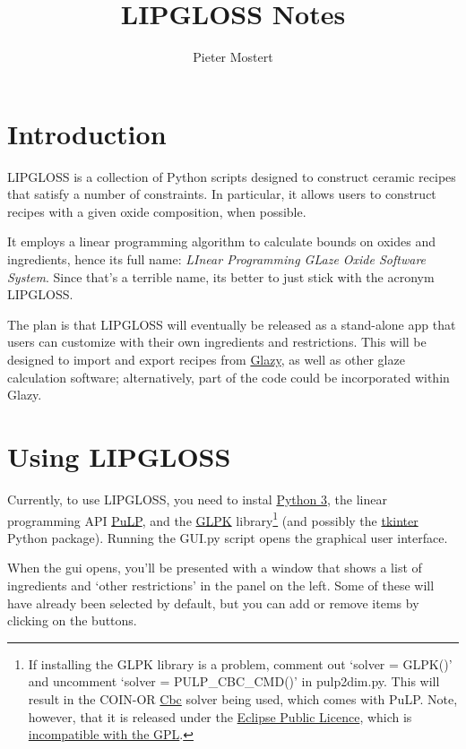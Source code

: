 \documentclass[a4paper,10pt]{article}
\title{LIPGLOSS Notes}
\author{Pieter Mostert}%
\def\'{\textquotesingle}
\begin{document}
\maketitle
\def\thefootnote{\fnsymbol{footnote}}\setcounter{footnote}{1}
\section{Introduction}
LIPGLOSS is a collection of Python scripts designed to construct ceramic recipes that satisfy a number of constraints. In particular, it allows users to construct recipes with a given oxide composition, when possible.

It employs a linear programming algorithm to calculate bounds on oxides and ingredients, hence its full name: \textit{LInear Programming GLaze Oxide Software System}. Since that's a terrible name, it\'s better to just stick with the acronym LIPGLOSS.

The plan is that LIPGLOSS will eventually be released as a stand-alone app that users can customize with their own ingredients and restrictions. This will be designed to import and export recipes from \href{https://glazy.org}{Glazy}, as well as other glaze calculation software; alternatively, part of the code could be incorporated within Glazy.

\section{Using LIPGLOSS}

Currently, to use LIPGLOSS, you need to instal \href{https://www.python.org/downloads/}{Python 3}, the linear programming API \href{https://github.com/coin-or/pulp}{PuLP}, and the \href{https://www.gnu.org/software/glpk/}{GLPK} library\footnote{If installing the GLPK library is a problem, comment out `solver = GLPK()' and uncomment `solver = PULP\_CBC\_CMD()' in pulp2dim.py. This will result in the COIN-OR \href{https://projects.coin-or.org/Cbc}{Cbc} solver being used, which comes with PuLP. Note, however, that it is released under the \href{https://en.wikipedia.org/wiki/Eclipse_Public_License}{Eclipse Public Licence}, which is \href{https://eclipse.org/legal/eplfaq.php}{incompatible with the GPL}.} (and possibly the \href{https://wiki.python.org/moin/TkInter}{tkinter} Python package). Running the GUI.py script opens the graphical user interface. 

When the gui opens, you'll be presented with a window that shows a list of ingredients and `other restrictions' in the panel on the left. Some of these will have already been selected by default, but you can add or remove items by clicking on the buttons.
\end{document}
